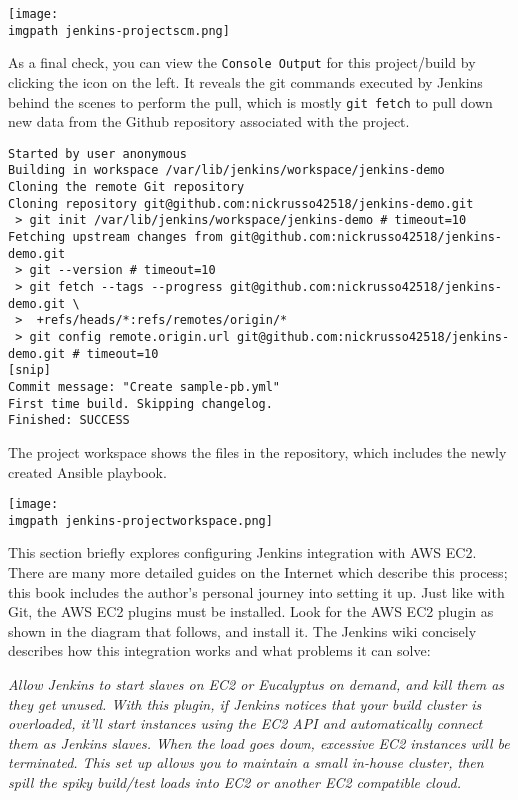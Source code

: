     \begin{minipage}[t]{\linewidth}
	  \centering
      \texttt{[image: \\imgpath jenkins-projectscm.png]}
    \end{minipage}

As a final check, you can view the \verb|Console Output| for this
project/build by clicking the icon on the left. It reveals the git commands
executed by Jenkins behind the scenes to perform the pull, which is mostly
\verb|git fetch| to pull down new data from the Github repository associated
with the project.

\begin{verbatim}
Started by user anonymous
Building in workspace /var/lib/jenkins/workspace/jenkins-demo
Cloning the remote Git repository
Cloning repository git@github.com:nickrusso42518/jenkins-demo.git
 > git init /var/lib/jenkins/workspace/jenkins-demo # timeout=10
Fetching upstream changes from git@github.com:nickrusso42518/jenkins-demo.git
 > git --version # timeout=10
 > git fetch --tags --progress git@github.com:nickrusso42518/jenkins-demo.git \
 >  +refs/heads/*:refs/remotes/origin/*
 > git config remote.origin.url git@github.com:nickrusso42518/jenkins-demo.git # timeout=10
[snip]
Commit message: "Create sample-pb.yml"
First time build. Skipping changelog.
Finished: SUCCESS
\end{verbatim}

The project workspace shows the files in the repository, which includes
the newly created Ansible playbook.

    \begin{minipage}[t]{\linewidth}
	  \centering
      \texttt{[image: \\imgpath jenkins-projectworkspace.png]}
    \end{minipage}

This section briefly explores configuring Jenkins integration with AWS EC2.
There are many more detailed guides on the Internet which describe this
process; this book includes the author's personal journey into setting it up.
Just like with Git, the AWS EC2 plugins must be installed. Look for the AWS
EC2 plugin as shown in the diagram that follows, and install it. The Jenkins wiki
concisely describes how this integration works and what problems it can solve:

\textit{
Allow Jenkins to start slaves on EC2 or Eucalyptus on demand, and kill them as
they get unused. With this plugin, if Jenkins notices that your build cluster
is overloaded, it'll start instances using the EC2 API and automatically
connect them as Jenkins slaves. When the load goes down, excessive EC2
instances will be terminated. This set up allows you to maintain a small
in-house cluster, then spill the spiky build/test loads into EC2 or another
EC2 compatible cloud.
}

